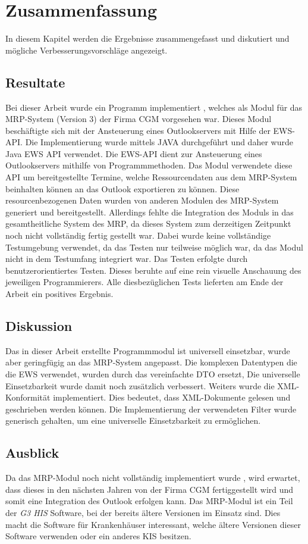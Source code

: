\chapter {Zusammenfassung}
In diesem Kapitel werden die Ergebnisse zusammengefasst und diskutiert und mögliche Verbesserungsvorschläge angezeigt.
\section{Resultate}
Bei dieser Arbeit wurde ein Programm implementiert , welches als Modul für das MRP-System (Version 3) der Firma CGM vorgesehen war. Dieses Modul beschäftigte sich mit der  Ansteuerung eines Outlookservers mit Hilfe der EWS-API. Die Implementierung wurde mittels JAVA durchgeführt und daher wurde Java EWS API verwendet. Die EWS-API dient zur Ansteuerung eines Outlookservers mithilfe von Programmmethoden. Das Modul verwendete diese API um bereitgestellte Termine, welche Ressourcendaten aus dem MRP-System beinhalten können an das Outlook exportieren zu können. Diese resourcenbezogenen Daten wurden von anderen Modulen des MRP-System generiert und bereitgestellt. Allerdings fehlte die Integration des Moduls in das gesamtheitliche System des MRP, da dieses System zum derzeitigen Zeitpunkt noch nicht vollständig fertig gestellt war. Dabei wurde keine vollständige Testumgebung verwendet, da das Testen nur teilweise möglich war, da das Modul nicht in dem Testumfang integriert war. Das Testen erfolgte durch benutzerorientiertes Testen. Dieses beruhte auf eine rein visuelle Anschauung des jeweiligen Programmierers. Alle diesbezüglichen Tests lieferten am Ende der Arbeit ein positives Ergebnis.
\section{Diskussion}
Das in dieser Arbeit erstellte Programmmodul ist universell einsetzbar, wurde aber geringfügig an das MRP-System angepasst. Die komplexen Datentypen die die EWS verwendet, wurden durch das vereinfachte DTO ersetzt, Die universelle Einsetzbarkeit wurde damit noch zusätzlich verbessert. Weiters wurde die XML-Konformität implementiert. Dies bedeutet, dass XML-Dokumente gelesen und geschrieben werden können. Die Implementierung der verwendeten Filter wurde generisch gehalten, um eine universelle Einsetzbarkeit zu ermöglichen.
\section{Ausblick}
Da das MRP-Modul noch nicht vollständig implementiert wurde , wird erwartet, dass dieses in den nächsten Jahren von der Firma CGM fertiggestellt wird und somit eine Integration des Outlook erfolgen kann. Das MRP-Modul ist ein Teil der \textit{G3 HIS} Software, bei der bereits ältere Versionen im Einsatz sind. Dies macht die Software für Krankenhäuser interessant, welche ältere Versionen dieser Software verwenden oder ein anderes KIS besitzen.